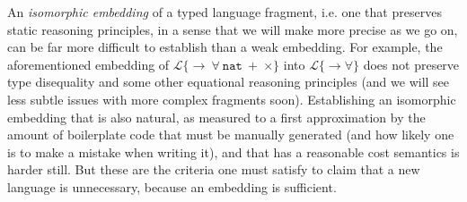 %



An \emph{isomorphic embedding} of a typed language fragment, i.e. one that preserves static reasoning principles, in a sense that we will make more precise as we go on, can be far more difficult to establish than a weak embedding. For example, the aforementioned embedding of $\mathcal{L}\{{\rightarrow}~{\forall}~\mathtt{nat}~{+}~{\times}\}$ into $\mathcal{L}\{\rightarrow\forall\}$ does not preserve type disequality and some other equational reasoning principles (and we will see less subtle issues with more complex fragments soon). Establishing an isomorphic embedding that is also natural, as measured to a first approximation by the amount of boilerplate code that must be manually generated (and how likely one is to make a mistake when writing it), and that has a reasonable cost semantics is harder still. But these are the criteria one must satisfy to claim that a new language is unnecessary, because an embedding is sufficient.

